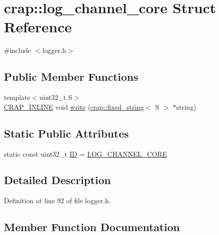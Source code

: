 \hypertarget{structcrap_1_1log__channel__core}{}\section{crap\+:\+:log\+\_\+channel\+\_\+core Struct Reference}
\label{structcrap_1_1log__channel__core}


{\ttfamily \#include $<$logger.\+h$>$}

\subsection*{Public Member Functions}
\begin{DoxyCompactItemize}
\item 
{\footnotesize template$<$uint32\+\_\+t S$>$ }\\\hyperlink{config__x86_8h_a5a40526b8d842e7ff731509998bb0f1c}{C\+R\+A\+P\+\_\+\+I\+N\+L\+I\+N\+E} void \hyperlink{structcrap_1_1log__channel__core_ac0b2f6125aeff6e6cb4e7d67be3c9c84}{write} (\hyperlink{classcrap_1_1fixed__string}{crap\+::fixed\+\_\+string}$<$ S $>$ $\ast$string)
\end{DoxyCompactItemize}
\subsection*{Static Public Attributes}
\begin{DoxyCompactItemize}
\item 
static const uint32\+\_\+t \hyperlink{structcrap_1_1log__channel__core_a6dbadca4befeb617fd8bc5a1a6b6fc01}{I\+D} = \hyperlink{logger_8h_af8df519e0d93f01f0237a41a093e19f8}{L\+O\+G\+\_\+\+C\+H\+A\+N\+N\+E\+L\+\_\+\+C\+O\+R\+E}
\end{DoxyCompactItemize}


\subsection{Detailed Description}


Definition at line 92 of file logger.\+h.



\subsection{Member Function Documentation}
\hypertarget{structcrap_1_1log__channel__core_ac0b2f6125aeff6e6cb4e7d67be3c9c84}{}
